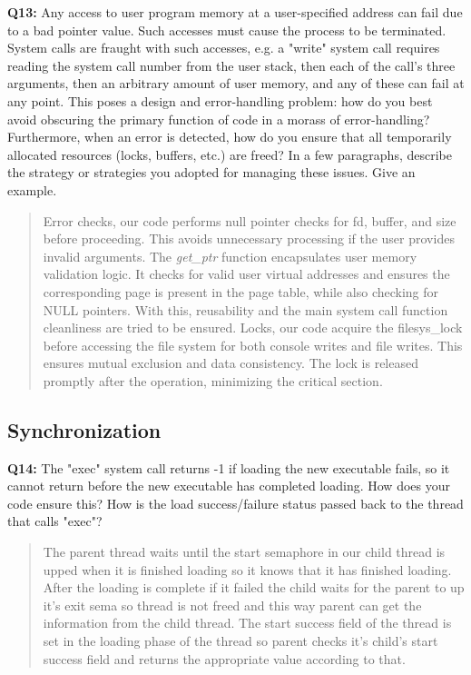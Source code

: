 \documentclass[a4paper,11pt]{paper}
\begin{document}
\textbf{Q13:} Any access to user program memory at a user-specified address can fail due to a bad pointer value.  Such accesses must cause the process to be terminated.  System calls are fraught with such accesses, e.g. a "write" system call requires reading the system call number from the user stack, then each of the call's three arguments, then an arbitrary amount of user memory, and any of these can fail at any point.  This poses a design and error-handling problem: how do you best avoid obscuring the primary function of code in a morass of error-handling?  Furthermore, when an error is detected, how do you ensure that all temporarily allocated resources (locks, buffers, etc.) are freed?  In a few paragraphs, describe the strategy or strategies you adopted for managing these issues.  Give an example.
\begin{quote}
  Error checks, our code performs null pointer checks for fd, buffer, and size before proceeding. This avoids unnecessary processing if the user provides invalid arguments.
  The \textit{get\_ptr} function encapsulates user memory validation logic. It checks for valid user virtual addresses and ensures the corresponding page is present in the page table, while also checking for NULL pointers. With this, reusability and the main system call function cleanliness are tried to be ensured.
  Locks, our code acquire the filesys\_lock before accessing the file system for both console writes and file writes. This ensures mutual exclusion and data consistency. The lock is released promptly after the operation, minimizing the critical section.
\end{quote}

\subsection{Synchronization}

\textbf{Q14:} The "exec" system call returns -1 if loading the new executable fails, so it cannot return before the new executable has completed loading.  How does your code ensure this?  How is the load success/failure status passed back to the thread that calls "exec"?
\begin{quote}
  The parent thread waits until the start semaphore in our child thread is upped when it is finished loading so it knows that it has finished loading. After the loading is complete if it failed the child waits for the parent to up it's exit sema so thread is not freed and this way parent can get the information from the child thread. The start success field of the thread is set in the loading phase of the thread so parent checks it's child's start success field and returns the appropriate value according to that.
\end{quote}
\end{document}
